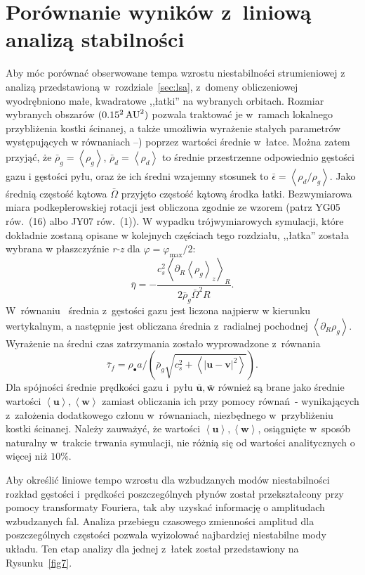 \section{Porównanie wyników z~liniową analizą stabilności}
\label{sec:simulation_analysis}
Aby móc porównać obserwowane tempa wzrostu niestabilności strumieniowej z
analizą przedstawioną w~rozdziale~\ref{sec:lsa}, z~domeny obliczeniowej
wyodrębniono małe, kwadratowe ,,łatki'' na wybranych orbitach. Rozmiar wybranych
obszarów $(0.15^2\hbox{$\thinspace\textrm{AU}$}^2)$ pozwala traktować je w~ramach lokalnego przybliżenia
kostki ścinanej, a także umożliwia wyrażenie stałych parametrów występujących w
równaniach --) poprzez wartości średnie w~łatce.
Można zatem przyjąć, że $\bar{\rho}_g = \left<\rho_g\right>$, $\bar{\rho}_d =
\left<\rho_d\right>$ to średnie przestrzenne odpowiednio gęstości gazu i
gęstości pyłu, oraz że ich średni wzajemny stosunek to $\bar{\epsilon} =
\left<\rho_d / \rho_g\right>$. Jako średnią częstość kątowa $\bar{\Omega}$
przyjęto częstość kątową środka łatki. Bezwymiarowa miara podkeplerowskiej
rotacji jest obliczona zgodnie ze wzorem (patrz YG05 rów.~(16) albo JY07
rów.~(1)). W wypadku trójwymiarowych symulacji, które dokładnie zostaną opisane
w kolejnych częściach tego rozdziału, ,,łatka'' została wybrana w
płaszczyźnie {\it r-z} dla $\varphi = \varphi_\textrm{max} / 2$:
%
\begin{equation}
   \bar{\eta} = -\frac{c_s^2\left<\partial_R \left<\rho_g\right>_z\right>_R}
      {2\bar{\rho}_g\bar{\Omega}^2 R}.
   \label{eq:meaneta}
\end{equation}
%
W~równaniu~ średnia z~gęstości gazu jest liczona najpierw w
kierunku wertykalnym, a następnie jest obliczana średnia z~radialnej pochodnej 
$\left<\partial_R \rho_g\right>$. Wyrażenie na średni czas zatrzymania zostało
wyprowadzone z~równania~
\begin{equation}
   \bar{\tau}_f = \rho_\bullet a / \left(\bar{\rho}_g \sqrt{c_s^2 +
   \left<\left|\mathbf{u} - \mathbf{v}\right|^2\right>} \right).
\end{equation}
%
Dla spójności średnie prędkości gazu i~pyłu $\bar{\mathbf{u}},
\bar{\mathbf{w}}$ również są brane jako średnie wartości
$\left<\mathbf{u}\right>, \left<\mathbf{w}\right>$ zamiast obliczania ich przy
pomocy równań~- wynikających z~założenia dodatkowego
członu w~równaniach, niezbędnego w~przybliżeniu kostki ścinanej. 
Należy zauważyć, że wartości $\left<\mathbf{u}\right>, \left<\mathbf{w}\right>$,
osiągnięte w~sposób naturalny w~trakcie trwania symulacji, nie różnią się od
wartości analitycznych o więcej niż $10\%$.
\par Aby określić liniowe tempo wzrostu dla wzbudzanych modów niestabilności
rozkład gęstości i~prędkości poszczególnych płynów został przekształcony przy
pomocy transformaty Fouriera, tak aby uzyskać informację o amplitudach
wzbudzanych fal. Analiza przebiegu czasowego zmienności amplitud dla
poszczególnych częstości pozwala wyizolować najbardziej niestabilne mody układu.
Ten etap analizy dla jednej z~łatek został przedstawiony na Rysunku~\ref{fig7}.

